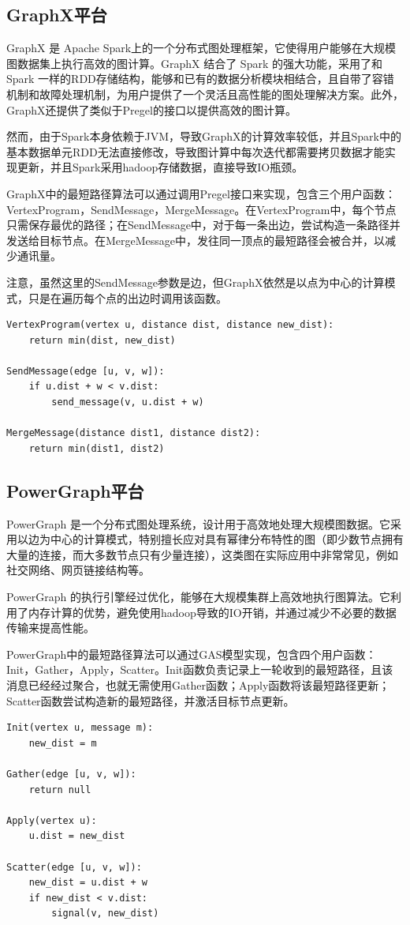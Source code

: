 \subsection{GraphX平台}

GraphX 是 Apache Spark上的一个分布式图处理框架，它使得用户能够在大规模图数据集上执行高效的图计算。GraphX 结合了 Spark 的强大功能，采用了和 Spark 一样的RDD存储结构，能够和已有的数据分析模块相结合，且自带了容错机制和故障处理机制，为用户提供了一个灵活且高性能的图处理解决方案。此外，GraphX还提供了类似于Pregel的接口以提供高效的图计算。

然而，由于Spark本身依赖于JVM，导致GraphX的计算效率较低，并且Spark中的基本数据单元RDD无法直接修改，导致图计算中每次迭代都需要拷贝数据才能实现更新，并且Spark采用hadoop存储数据，直接导致IO瓶颈。

GraphX中的最短路径算法可以通过调用Pregel接口来实现，包含三个用户函数：VertexProgram，SendMessage，MergeMessage。在VertexProgram中，每个节点只需保存最优的路径；在SendMessage中，对于每一条出边，尝试构造一条路径并发送给目标节点。在MergeMessage中，发往同一顶点的最短路径会被合并，以减少通讯量。

注意，虽然这里的SendMessage参数是边，但GraphX依然是以点为中心的计算模式，只是在遍历每个点的出边时调用该函数。

\begin{lstlisting}
VertexProgram(vertex u, distance dist, distance new_dist):
    return min(dist, new_dist)

SendMessage(edge [u, v, w]):
    if u.dist + w < v.dist:
        send_message(v, u.dist + w)

MergeMessage(distance dist1, distance dist2):
    return min(dist1, dist2)
\end{lstlisting}

\subsection{PowerGraph平台}

PowerGraph 是一个分布式图处理系统，设计用于高效地处理大规模图数据。它采用以边为中心的计算模式，特别擅长应对具有幂律分布特性的图（即少数节点拥有大量的连接，而大多数节点只有少量连接），这类图在实际应用中非常常见，例如社交网络、网页链接结构等。

PowerGraph 的执行引擎经过优化，能够在大规模集群上高效地执行图算法。它利用了内存计算的优势，避免使用hadoop导致的IO开销，并通过减少不必要的数据传输来提高性能。

PowerGraph中的最短路径算法可以通过GAS模型实现，包含四个用户函数：Init，Gather，Apply，Scatter。Init函数负责记录上一轮收到的最短路径，且该消息已经经过聚合，也就无需使用Gather函数；Apply函数将该最短路径更新；Scatter函数尝试构造新的最短路径，并激活目标节点更新。
\begin{lstlisting}
Init(vertex u, message m):
    new_dist = m

Gather(edge [u, v, w]):
    return null

Apply(vertex u):
    u.dist = new_dist

Scatter(edge [u, v, w]):
    new_dist = u.dist + w
    if new_dist < v.dist:
        signal(v, new_dist)
\end{lstlisting}






